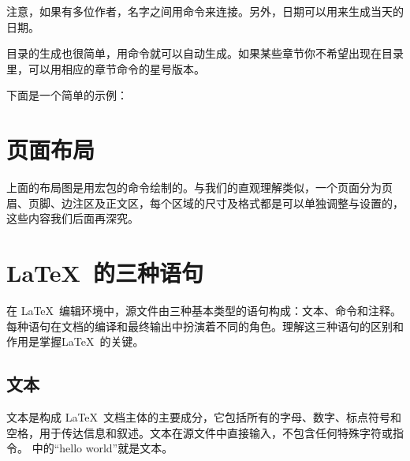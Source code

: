 注意，如果有多位作者，名字之间用\texinline{\and}命令来连接。另外，日期可以用\texinline{\today}来生成当天的日期。

目录的生成也很简单，用\texinline{\tableofcontents}命令就可以自动生成。如果某些章节你不希望出现在目录里，可以用相应的章节命令的星号版本。

下面是一个简单的示例：

\clearpage

\section{页面布局}
\drawpage

上面的布局图是用宏包的\texinline{\drawpage}命令绘制的。与我们的直观理解类似，一个页面分为页眉、页脚、边注区及正文区，每个区域的尺寸及格式都是可以单独调整与设置的，这些内容我们后面再深究。

\section{\LaTeX\ 的三种语句} \label{sec:text type}
在 \LaTeX\ 编辑环境中，源文件由三种基本类型的语句构成：文本、命令和注释。每种语句在文档的编译和最终输出中扮演着不同的角色。理解这三种语句的区别和作用是掌握\LaTeX\ 的关键。

\subsection{文本}
文本是构成 \LaTeX\
文档主体的主要成分，它包括所有的字母、数字、标点符号和空格，用于传达信息和叙述。文本在源文件中直接输入，不包含任何特殊字符或指令。
\nameref{code:hello}中的\enquote{hello
	world}就是文本。

